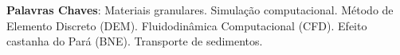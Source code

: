 \begin{resumo}
    \textbf{Palavras Chaves}: Materiais granulares. Simulação computacional. Método de Elemento Discreto (DEM). Fluidodinâmica Computacional (CFD). Efeito castanha do Pará (BNE). Transporte de sedimentos.


\end{resumo}

